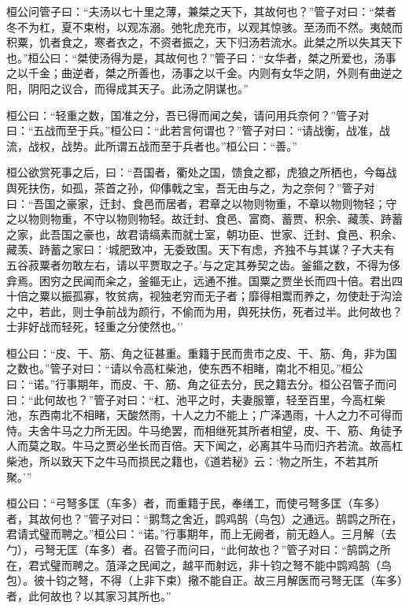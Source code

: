 \documentclass[]{article}
\begin{document}
桓公问管子曰：``夫汤以七十里之薄，兼桀之天下，其故何也？''管子对曰：``桀者冬不为杠，夏不束柎，以观冻溺。弛牝虎充市，以观其惊骇。至汤而不然。夷兢而积粟，饥者食之，寒者衣之，不资者振之，天下归汤若流水。此桀之所以失其天下也。''桓公曰：``桀使汤得为是，其故何也？''管子曰：``女华者，桀之所爱也，汤事之以千金；曲逆者，桀之所善也，汤事之以千金。内则有女华之阴，外则有曲逆之阳，阴阳之议合，而得成其天子。此汤之阴谋也。''

桓公曰：``轻重之数，国准之分，吾已得而闻之矣，请问用兵奈何？''管子对曰：``五战而至于兵。''桓公曰：``此若言何谓也？''管子对曰：``请战衡，战准，战流，战权，战势。此所谓五战而至于兵者也。''桓公曰：``善。''

桓公欲赏死事之后，曰：``吾国者，衢处之国，馈食之都，虎狼之所栖也，今每战舆死扶伤，如孤，茶首之孙，仰倳戟之宝，吾无由与之，为之奈何？''管子对曰：``吾国之豪家，迁封、食邑而居者，君章之以物则物重，不章以物则物轻；守之以物则物重，不守以物则物轻。故迁封、食邑、富商、蓄贾、积余、藏羡、跱蓄之家，此吾国之豪也，故君请缟素而就士室，朝功臣、世家、迁封、食邑、积余、藏羡、跱蓄之家曰：`城肥致冲，无委致围。天下有虑，齐独不与其谋？子大夫有五谷菽粟者勿敢左右，请以平贾取之子。'与之定其券契之齿。釜鏂之数，不得为侈弇焉。困穷之民闻而籴之，釜鏂无止，远通不推。国粟之贾坐长而四十倍。君出四十倍之粟以振孤寡，牧贫病，视独老穷而无子者；靡得相鬻而养之，勿使赴于沟浍之中，若此，则士争前战为颜行，不偷而为用，舆死扶伤，死者过半。此何故也？士非好战而轻死，轻重之分使然也。''

桓公曰：``皮、干、筋、角之征甚重。重籍于民而贵市之皮、干、筋、角，非为国之数也。''管子对曰：``请以令高杠柴池，使东西不相睹，南北不相见。''桓公曰：``诺。''行事期年，而皮、干、筋、角之征去分，民之籍去分。桓公召管子而问曰：``此何故也？''管子对曰：``杠、池平之时，夫妻服簟，轻至百里，今高杠柴池，东西南北不相睹，天酸然雨，十人之力不能上；广泽遇雨，十人之力不可得而恃。夫舍牛马之力所无因。牛马绝罢，而相继死其所者相望，皮、干、筋、角徒予人而莫之取。牛马之贾必坐长而百倍。天下闻之，必离其牛马而归齐若流。故高杠柴池，所以致天下之牛马而损民之籍也，《道若秘》云：`物之所生，不若其所聚。'''

桓公曰：``弓弩多匡（车多）者，而重籍于民，奉缮工，而使弓弩多匡（车多）者，其故何也？''管子对曰：``鹅骛之舍近，鹍鸡鹄（鸟包）之通远。鹄鹍之所在，君请式璧而聘之。''桓公曰：``诺。''行事期年，而上无阙者，前无趋人。三月解（去勹），弓弩无匡（车多）者。召管子而问曰，``此何故也？''管子对曰：``鹄鹍之所在，君式璧而聘之。菹泽之民闻之，越平而射远，非十钧之弩不能中鹍鸡鹄（鸟包）。彼十钧之弩，不得（上非下束）擏不能自正。故三月解医而弓弩无匡（车多）者，此何故也？以其家习其所也。''
\end{document}
